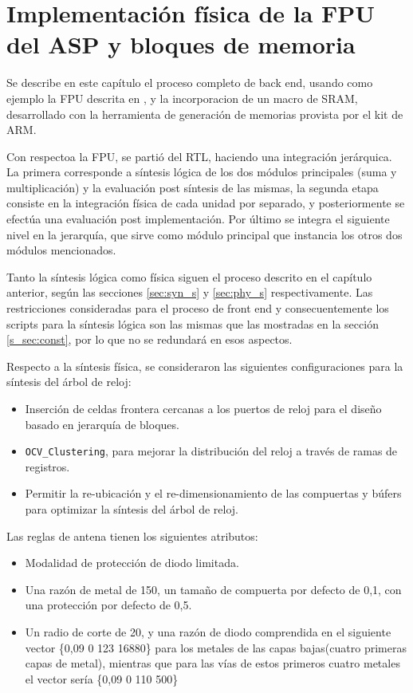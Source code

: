 \chapter{Implementación física de la FPU del ASP y bloques de memoria}

Se describe en este capítulo el proceso completo de back end, usando como ejemplo la FPU descrita en \cite{Francis2016, concapan}, y la incorporacion de un macro de SRAM, desarrollado con la herramienta de generación de memorias provista por el kit de ARM. 

Con respectoa la FPU, se partió del RTL, haciendo una integración jerárquica. La primera corresponde a síntesis lógica de los dos módulos principales (suma y multiplicación) y la evaluación post síntesis de las mismas, la segunda etapa consiste en la integración física de cada unidad por separado, y posteriormente se efectúa una evaluación post implementación. Por último se integra el siguiente nivel en la jerarquía, que sirve como módulo principal que instancia los otros dos módulos mencionados.

Tanto la síntesis lógica como física siguen el proceso descrito en el capítulo anterior, según las secciones \ref{sec:syn_s} y \ref{sec:phy_s} respectivamente. Las restricciones consideradas para el proceso de front end y consecuentemente los scripts para la síntesis lógica son las mismas que las mostradas en la sección \ref{s_sec:const}, por lo que no se redundará en esos aspectos.

Respecto a la síntesis física, se consideraron las siguientes configuraciones para la síntesis del árbol de reloj:

\begin{itemize}
\item Inserción de celdas frontera cercanas a los puertos de reloj para el diseño basado en jerarquía de bloques.
\item \texttt{OCV\_Clustering}, para mejorar la distribución del reloj a través de ramas de registros. 
\item Permitir la re-ubicación y el re-dimensionamiento de las compuertas y búfers para optimizar la síntesis del árbol de reloj.
\end{itemize}

Las reglas de antena tienen los siguientes atributos:
\begin{itemize}
\item Modalidad de protección de diodo limitada.
\item Una razón de metal de 150, un tamaño de compuerta por defecto de 0,1, con una protección por defecto de 0,5.
\item Un radio de corte de 20, y una razón de diodo comprendida en el siguiente vector \{0,09 0 123 16880\} para los metales de las capas bajas(cuatro primeras capas de metal), mientras que para las vías de estos primeros cuatro metales el vector sería \{0,09 0 110 500\}
\end{itemize}

